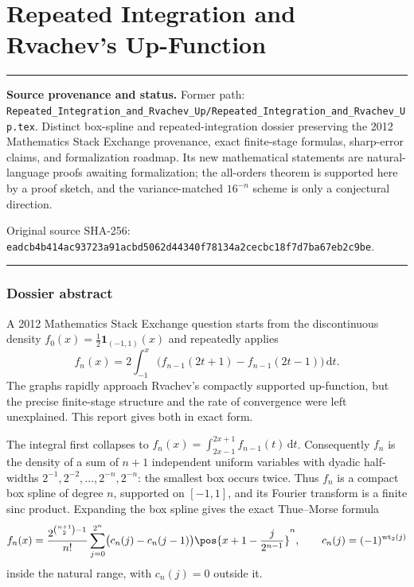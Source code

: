 \documentclass[11pt,oneside]{article}
\theoremstyle{definition}
\theoremstyle{remark}
\newcommand{\wt}{\operatorname{wt}_2}
\newcommand{\dd}{\,\mathrm d}
\newenvironment{boxedremark}{%
  \par\smallskip\noindent\begin{center}\begin{minipage}{0.94\textwidth}%
  \color{black}\hrule\vspace{0.6em}\small
}{%
  \vspace{0.6em}\hrule\end{minipage}\end{center}\smallskip
}
\begin{document}
\part{Repeated Integration and Rvachev's Up-Function}
\label{part:repeated}
\begin{boxedremark}
\textbf{Source provenance and status.} Former path: \nolinkurl{Repeated_Integration_and_Rvachev_Up/Repeated_Integration_and_Rvachev_Up.tex}.  Distinct box-spline and repeated-integration dossier preserving the 2012 Mathematics Stack Exchange provenance, exact finite-stage formulas, sharp-error claims, and formalization roadmap.  Its new mathematical statements are natural-language proofs awaiting formalization; the all-orders theorem is supported here by a proof sketch, and the variance-matched \(16^{-n}\) scheme is only a conjectural direction.\par\smallskip Original source SHA-256: \nolinkurl{eadcb4b414ac93723a91acbd5062d44340f78134a2cecbc18f7d7ba67eb2c9be}.
\end{boxedremark}
\section*{Dossier abstract}
A 2012 Mathematics Stack Exchange question starts from the discontinuous density
$f_0(x)=\tfrac12\mathbf 1_{(-1,1)}(x)$ and repeatedly applies
\[
 f_n(x)=2\int_{-1}^{x}\bigl(f_{n-1}(2t+1)-f_{n-1}(2t-1)\bigr)\dd t.
\]
The graphs rapidly approach Rvachev's compactly supported up-function, but the precise
finite-stage structure and the rate of convergence were left unexplained.  This report gives
both in exact form.

The integral first collapses to
$f_n(x)=\int_{2x-1}^{2x+1}f_{n-1}(t)\dd t$.  Consequently $f_n$ is the density of a sum of
$n+1$ independent uniform variables with dyadic half-widths
$2^{-1},2^{-2},\ldots,2^{-n},2^{-n}$: the smallest box occurs twice.  Thus $f_n$ is a compact
box spline of degree $n$, supported on $[-1,1]$, and its Fourier transform is a finite sinc
product.  Expanding the box spline gives the exact Thue--Morse formula
\[
 f_n(x)=\frac{2^{\binom{n+1}{2}-1}}{n!}
 \sum_{j=0}^{2^n}\bigl(c_n(j)-c_n(j-1)\bigr)
 \pos{x+1-\frac{j}{2^{n-1}}}^{n},
 \qquad c_n(j)=(-1)^{\wt(j)}
\]
inside the natural range, with $c_n(j)=0$ outside it.
\end{document}

